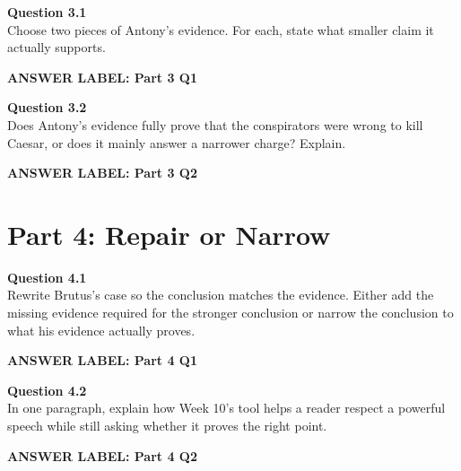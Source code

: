 \documentclass[12pt]{article}
\newcommand{\answerbox}[2]{%
\vspace{0.12em}
\noindent\textbf{#1}\par
\vspace{0.04em}
\noindent\fbox{%
\begin{minipage}[t][#2]{\dimexpr\textwidth-2\fboxsep-2\fboxrule}
\rule{\textwidth}{0pt}
\vspace{#2}
\end{minipage}}
\par\vspace{0.22em}}
\begin{document}
\textbf{Question 3.1}\\[-0.15em]
Choose two pieces of Antony's evidence. For each, state what smaller claim it actually supports.

\answerbox{ANSWER LABEL: Part 3 Q1}{2.45in}

\textbf{Question 3.2}\\[-0.15em]
Does Antony's evidence fully prove that the conspirators were wrong to kill Caesar, or does it mainly answer a narrower charge? Explain.

\answerbox{ANSWER LABEL: Part 3 Q2}{2.45in}

\newpage

\section*{Part 4: Repair or Narrow}

\textbf{Question 4.1}\\[-0.15em]
Rewrite Brutus's case so the conclusion matches the evidence. Either add the missing evidence required for the stronger conclusion or narrow the conclusion to what his evidence actually proves.

\answerbox{ANSWER LABEL: Part 4 Q1}{2.45in}

\textbf{Question 4.2}\\[-0.15em]
In one paragraph, explain how Week 10's tool helps a reader respect a powerful speech while still asking whether it proves the right point.

\answerbox{ANSWER LABEL: Part 4 Q2}{2.45in}
\end{document}
